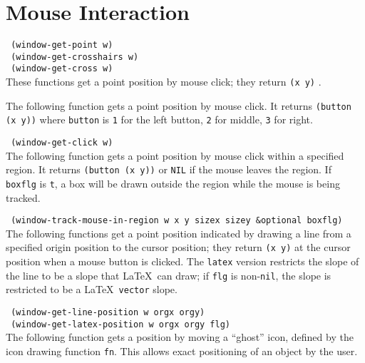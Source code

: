 \section{Mouse Interaction}

{\tt \hspace*{0.5in} (window-get-point w)} \\
{\tt \hspace*{0.5in} (window-get-crosshairs w)} \\
{\tt \hspace*{0.5in} (window-get-cross w)} \\
These functions  get a point position by mouse click; they return {\tt (x y)} .

The following function gets a point position by mouse click.  It returns
{\tt (button (x y))} where {\tt button} is {\tt 1} for the left button,
{\tt 2} for middle, {\tt 3} for right.

{\tt \hspace*{0.5in} (window-get-click w)} \\

The following function gets a point position by mouse click within a specified
region.  It returns {\tt (button (x y))} or {\tt NIL} if the mouse leaves
the region.  If {\tt boxflg} is {\tt t}, a box will be drawn outside the
region while the mouse is being tracked.

{\tt \hspace*{0.5in} (window-track-mouse-in-region w x y sizex sizey \&optional boxflg)} \\


The following functions get a point position indicated by drawing a line
from a specified origin position to the cursor position; they return
{\tt (x y)} at the cursor position when a mouse button is clicked.
The {\tt latex} version restricts the slope of the line to be a slope that
\LaTeX \ can draw; if {\tt flg} is non-{\tt nil}, the slope is restricted
to be a \LaTeX \ {\tt vector} slope.

{\tt \hspace*{0.5in} (window-get-line-position w orgx orgy)} \\
{\tt \hspace*{0.5in} (window-get-latex-position w orgx orgy flg)} \\

The following function gets a position by moving a ``ghost'' icon,
defined by the icon drawing function {\tt fn}.  This allows exact positioning
of an object by the user.

